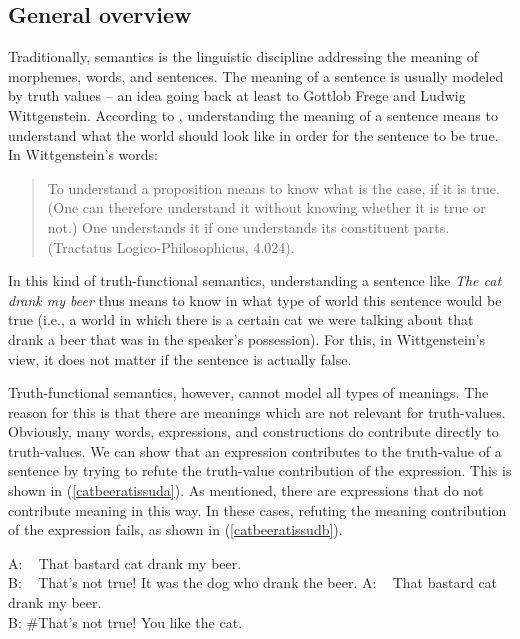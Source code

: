 \subsection{General overview}
Traditionally, semantics is the linguistic discipline addressing the meaning of morphemes, words, and sentences. The meaning of a sentence is usually modeled by truth values -- an idea going back at least to Gottlob Frege and Ludwig Wittgenstein. According to \citet{wittgenstein1922trac}, understanding the meaning of a sentence means to understand what the world should look like in order for the sentence to be true. In Wittgenstein's words:

\begin{quote}
To understand a proposition means to know what is the case, if it is true. (One can therefore understand it without knowing whether it is true or not.) One understands it if one understands its constituent parts. (Tractatus Logico-Philosophicus, 4.024).
\end{quote} 

\noindent In this kind of truth-functional semantics, understanding a sentence like \textit{The cat drank my beer} thus means to know in what type of world this sentence would be true (i.e., a world in which there is a certain cat we were talking about that drank a beer that was in the speaker's possession). For this, in Wittgenstein's view, it does not matter if the sentence is actually false. 

Truth-functional semantics, however, cannot model all types of meanings. The reason for this is that there are meanings which are not relevant for truth-values. Obviously, many words, expressions, and constructions do contribute directly to truth-values. We can show that an expression contributes to the truth-value of a sentence by trying to refute the truth-value contribution of the expression. This is shown in (\ref{catbeeratissuda}). As mentioned, there are expressions that do not contribute meaning in this way. In these cases, refuting the meaning contribution of the expression fails, as shown in (\ref{catbeeratissudb}). 

\begin{exe}
\ex\label{catbeeratissud}\begin{xlist}
\ex A: \textcolor{white}{\#}That bastard cat drank my beer.  \\
B: \textcolor{white}{\#}That's not true! It was the dog who drank the beer.\label{catbeeratissuda}
\ex A: \textcolor{white}{\#}That bastard cat drank my beer.  \\
B: {\#}That's not true! You like the cat.\label{catbeeratissudb}
\end{xlist}
\end{exe}

